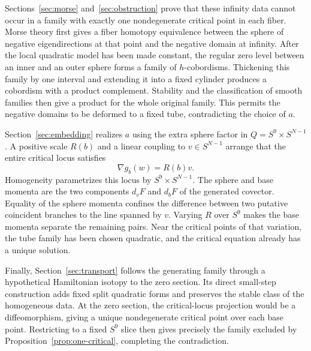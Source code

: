 Sections~\ref{sec:morse} and~\ref{sec:obstruction} prove that these
infinity data cannot occur in a family with exactly one nondegenerate
critical point in each fiber. Morse theory first gives a fiber homotopy
equivalence between the sphere of negative eigendirections at that point
and the negative domain at infinity. After the local quadratic model has been made constant, the
regular zero level between an inner and an outer sphere forms a family
of $h$-cobordisms. Thickening this family by one interval and extending
it into a fixed cylinder produces a cobordism with a product complement.
Stability and the classification of smooth families then give a product
for the whole original family. This permits the negative domains to be
deformed to a fixed tube, contradicting the choice of $a$.

Section~\ref{sec:embedding} realizes $a$ using the extra sphere factor
in $Q=S^9\times S^{N-1}$. A positive scale $R(b)$ and a linear coupling
to $v\in S^{N-1}$ arrange that the entire critical locus satisfies
\[
 \nabla g_b(w)=R(b)v.
\]
Homogeneity parametrizes this locus by $S^9\times S^{N-1}$. The sphere
and base momenta are the two components $d_vF$ and $d_bF$ of the generated
covector. Equality of the sphere momenta confines the difference between two putative
coincident branches to the line spanned by $v$. Varying $R$ over $S^9$
makes the base momenta separate the remaining pairs. Near the critical
points of that variation, the tube family has been chosen quadratic,
and the critical equation already has a unique solution.

Finally, Section~\ref{sec:transport} follows the generating family
through a hypothetical Hamiltonian isotopy to the zero section. Its
direct small-step construction adds fixed split quadratic forms and
preserves the stable class of the homogeneous data. At the zero section,
the critical-locus projection would be a diffeomorphism, giving a unique
nondegenerate critical point over each base point. Restricting to a fixed
$S^9$ slice then gives precisely the family excluded by
Proposition~\ref{prop:one-critical}, completing the contradiction.

